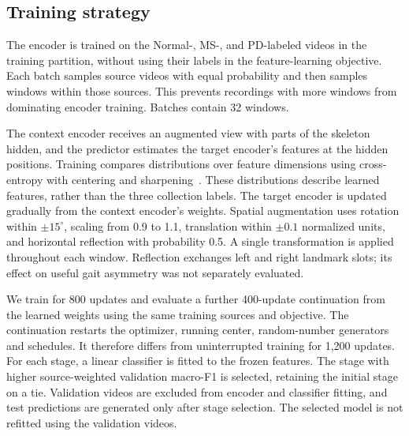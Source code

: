 \subsection{Training strategy}
The encoder is trained on the Normal-, MS-, and PD-labeled videos in the training partition, without using their labels in the feature-learning objective. Each batch samples source videos with equal probability and then samples windows within those sources. This prevents recordings with more windows from dominating encoder training. Batches contain 32 windows.

The context encoder receives an augmented view with parts of the skeleton hidden, and the predictor estimates the target encoder's features at the hidden positions. Training compares distributions over feature dimensions using cross-entropy with centering and sharpening~\cite{dino}. These distributions describe learned features, rather than the three collection labels. The target encoder is updated gradually from the context encoder's weights. Spatial augmentation uses rotation within $\pm15^\circ$, scaling from 0.9 to 1.1, translation within $\pm0.1$ normalized units, and horizontal reflection with probability 0.5. A single transformation is applied throughout each window. Reflection exchanges left and right landmark slots; its effect on useful gait asymmetry was not separately evaluated.

We train for 800 updates and evaluate a further 400-update continuation from the learned weights using the same training sources and objective. The continuation restarts the optimizer, running center, random-number generators and schedules. It therefore differs from uninterrupted training for 1,200 updates. For each stage, a linear classifier is fitted to the frozen features. The stage with higher source-weighted validation macro-F1 is selected, retaining the initial stage on a tie. Validation videos are excluded from encoder and classifier fitting, and test predictions are generated only after stage selection. The selected model is not refitted using the validation videos.
